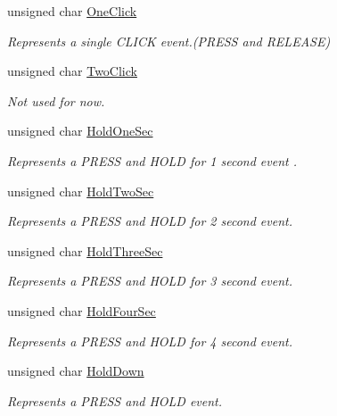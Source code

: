 \begin{DoxyCompactItemize}
\item 
unsigned char \hyperlink{struct_button_events_ae264a0be71f712b37a93e72693a807cd}{One\+Click}
\begin{DoxyCompactList}\small\item\em Represents a single C\+L\+I\+CK event.(P\+R\+E\+SS and R\+E\+L\+E\+A\+SE) \end{DoxyCompactList}\item 
unsigned char \hyperlink{struct_button_events_a2feb3df7ddb99aeafd38cd80b18a9eee}{Two\+Click}
\begin{DoxyCompactList}\small\item\em Not used for now. \end{DoxyCompactList}\item 
unsigned char \hyperlink{struct_button_events_a7ef7e7cbb9addb84a1319b7cf635520f}{Hold\+One\+Sec}
\begin{DoxyCompactList}\small\item\em Represents a P\+R\+E\+SS and H\+O\+LD for 1 second event . \end{DoxyCompactList}\item 
unsigned char \hyperlink{struct_button_events_a0f52b2243f5ed9878283f83f5b8bd66b}{Hold\+Two\+Sec}
\begin{DoxyCompactList}\small\item\em Represents a P\+R\+E\+SS and H\+O\+LD for 2 second event. \end{DoxyCompactList}\item 
unsigned char \hyperlink{struct_button_events_ab54e7f4ce7ac349f8a0fedaa82483e8f}{Hold\+Three\+Sec}
\begin{DoxyCompactList}\small\item\em Represents a P\+R\+E\+SS and H\+O\+LD for 3 second event. \end{DoxyCompactList}\item 
unsigned char \hyperlink{struct_button_events_a9c871beb62f78a16231448b5718c5128}{Hold\+Four\+Sec}
\begin{DoxyCompactList}\small\item\em Represents a P\+R\+E\+SS and H\+O\+LD for 4 second event. \end{DoxyCompactList}\item 
unsigned char \hyperlink{struct_button_events_ad995e95da85ebfa27b5d4dedaa771b92}{Hold\+Down}
\begin{DoxyCompactList}\small\item\em Represents a P\+R\+E\+SS and H\+O\+LD event. \end{DoxyCompactList}\end{DoxyCompactItemize}


